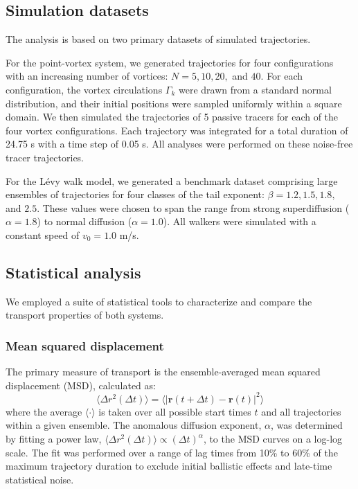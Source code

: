 \documentclass[]{article}
\begin{document}
\subsection{Simulation datasets}

The analysis is based on two primary datasets of simulated trajectories.

For the point-vortex system, we generated trajectories for four configurations with an increasing number of vortices: $N=5, 10, 20,$ and $40$. For each configuration, the vortex circulations $\Gamma_k$ were drawn from a standard normal distribution, and their initial positions were sampled uniformly within a square domain. We then simulated the trajectories of 5 passive tracers for each of the four vortex configurations. Each trajectory was integrated for a total duration of 24.75 s with a time step of 0.05 s. All analyses were performed on these noise-free tracer trajectories.

For the Lévy walk model, we generated a benchmark dataset comprising large ensembles of trajectories for four classes of the tail exponent: $\beta = 1.2, 1.5, 1.8,$ and $2.5$. These values were chosen to span the range from strong superdiffusion ($\alpha=1.8$) to normal diffusion ($\alpha=1.0$). All walkers were simulated with a constant speed of $v_0 = 1.0$ m/s.

\subsection{Statistical analysis}

We employed a suite of statistical tools to characterize and compare the transport properties of both systems.

\subsubsection{Mean squared displacement}
The primary measure of transport is the ensemble-averaged mean squared displacement (MSD), calculated as:
\begin{equation}
\langle \Delta r^2(\Delta t) \rangle = \langle |\mathbf{r}(t+\Delta t) - \mathbf{r}(t)|^2 \rangle
\end{equation}
where the average $\langle \cdot \rangle$ is taken over all possible start times $t$ and all trajectories within a given ensemble. The anomalous diffusion exponent, $\alpha$, was determined by fitting a power law, $\langle \Delta r^2(\Delta t) \rangle \propto (\Delta t)^\alpha$, to the MSD curves on a log-log scale. The fit was performed over a range of lag times from 10\% to 60\% of the maximum trajectory duration to exclude initial ballistic effects and late-time statistical noise.
\end{document}
